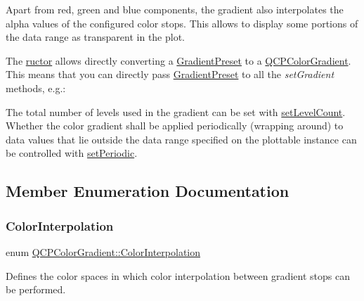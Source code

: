 Apart from red, green and blue components, the gradient also interpolates the alpha values of the configured color stops. This allows to display some portions of the data range as transparent in the plot.



The \hyperlink{class_q_c_p_color_gradient}{ructor} allows directly converting a \hyperlink{class_q_c_p_color_gradient_aed6569828fee337023670272910c9072}{Gradient\+Preset} to a \hyperlink{class_q_c_p_color_gradient}{Q\+C\+P\+Color\+Gradient}. This means that you can directly pass \hyperlink{class_q_c_p_color_gradient_aed6569828fee337023670272910c9072}{Gradient\+Preset} to all the {\itshape set\+Gradient} methods, e.\+g.\+: 
\begin{DoxyCodeInclude}
\end{DoxyCodeInclude}
 The total number of levels used in the gradient can be set with \hyperlink{class_q_c_p_color_gradient_a18da587eb4f7fc788ea28ba15b6a12de}{set\+Level\+Count}. Whether the color gradient shall be applied periodically (wrapping around) to data values that lie outside the data range specified on the plottable instance can be controlled with \hyperlink{class_q_c_p_color_gradient_a39d6448155fc00a219f239220d14bb39}{set\+Periodic}. 

\subsection{Member Enumeration Documentation}
\mbox{\label{class_q_c_p_color_gradient_ac5dca17cc24336e6ca176610e7f77fc1}} 
\subsubsection{\texorpdfstring{Color\+Interpolation}{ColorInterpolation}}
{\footnotesize\ttfamily enum \hyperlink{class_q_c_p_color_gradient_ac5dca17cc24336e6ca176610e7f77fc1}{Q\+C\+P\+Color\+Gradient\+::\+Color\+Interpolation}}

Defines the color spaces in which color interpolation between gradient stops can be performed.

